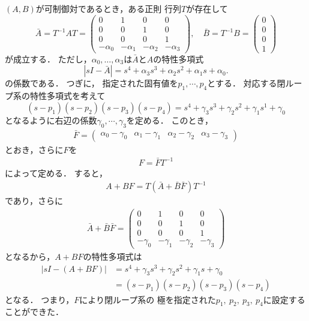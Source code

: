 \documentclass[a4,10pt]{article}
\newcommand{\bmat}[1]{\left( \begin{array}{#1}}  	%
\newcommand{\emat}{\end{array} \right)}			%
\begin{document}
\begin{enumerate}
    $(A,B)$が可制御対であるとき，ある正則
    行列$T$が存在して
    \begin{displaymath}
     \bar{A} = T^{-1}AT = \bmat{cccc} 
                  0 & 1 & 0 & 0 \\
                  0 & 0 & 1 & 0 \\
                  0 & 0 & 0 & 1 \\
                  -\alpha_0 & -\alpha_1 & -\alpha_2 & -\alpha_3 
               \emat, \quad
     \bar{B} = T^{-1}B = \bmat{c} 0 \\ 0 \\ 0 \\ 1 \emat
    \end{displaymath}
    が成立する．
    ただし，$\alpha_0, \ldots, \alpha_3$は$\bar{A}$と$A$の特性多項式
    \begin{equation*}
    \left|s I-\bar{A}\right|=s^4 + \alpha_3s^3 + \alpha_2s^2 + \alpha_1s + 
     \alpha_0.  
    \end{equation*}
    の係数である．
    つぎに，
    指定された固有値を$p_1,\cdots,p_4$とする．
    対応する閉ループ系の特性多項式を考えて
\begin{displaymath}
 (s-p_1)(s-p_2)(s-p_3)(s-p_4) = s^4 + \gamma_3 s^3 + \gamma_2 s^2 + \gamma_1 s^1 + \gamma_0
\end{displaymath}
となるように右辺の係数$\gamma_0,\cdots,\gamma_3$を定める．
    このとき，
    \begin{align}
         \bar{F}=\bmat{cccc} \alpha_0-\gamma_0 & \alpha_1-\gamma_1 & \alpha_2-\gamma_2 & \alpha_3-\gamma_3 \emat 
    \end{align}
   とおき，さらに$F$を
   \begin{align}
       F = \bar{F}T^{-1}
   \end{align}
    によって定める．
    すると，
    \begin{align}
        A+BF = T(\bar{A}+\bar{B}\bar{F})T^{-1}
    \end{align}
    であり，さらに
    \begin{align}
         \bar{A}+\bar{B}\bar{F} = 
         \bmat{cccc} 
                  0 & 1 & 0 & 0 \\
                  0 & 0 & 1 & 0 \\
                  0 & 0 & 0 & 1 \\
                  -\gamma_0 & -\gamma_1 & -\gamma_2 & -\gamma_3 
               \emat
    \end{align}
    となるから，$A+BF$の特性多項式は
    \begin{align}
        \left|s I-(A+BF)\right|&=s^4 + \gamma_3s^3 + \gamma_2s^2 + \gamma_1s + 
        \gamma_0 \\
        &= (s-p_1)(s-p_2)(s-p_3)(s-p_4)
    \end{align}
    となる．
    つまり，$F$により閉ループ系の
    極を指定された$p_1,~ p_2, ~ p_3, ~ p_4$に設定することができた．
    

\end{enumerate}
\end{document}
